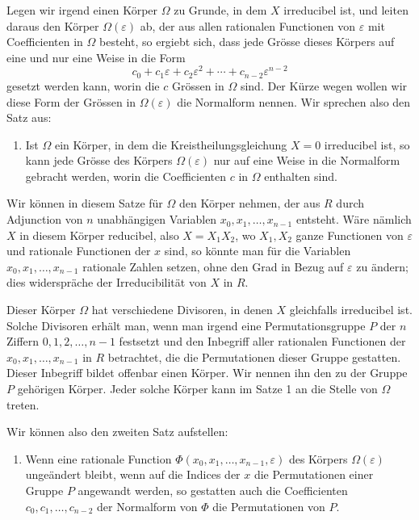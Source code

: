 \documentclass[11pt]{article}
\begin{document}
Legen wir irgend einen K\"orper $\Omega$ zu Grunde, in dem $X$ irreducibel ist, und leiten daraus den K\"orper $\Omega(\varepsilon)$ ab, der aus allen rationalen Functionen von $\varepsilon$ mit Coefficienten in $\Omega$ besteht, so ergiebt sich, dass jede Gr\"osse dieses K\"orpers auf eine und nur eine Weise in die Form
\begin{equation}\tag{3}
  c_0+c_1\varepsilon+c_2\varepsilon^2+\cdots+c_{n-2}\varepsilon^{n-2}
\end{equation}
gesetzt werden kann, worin die $c$ Gr\"ossen in $\Omega$ sind. Der K\"urze wegen wollen wir diese Form der Gr\"ossen in $\Omega(\varepsilon)$ die Normalform nennen. Wir sprechen also den Satz aus:

\begin{enumerate}[label=\arabic*.]
\item Ist $\Omega$ ein K\"orper, in dem die Kreistheilungsgleichung $X=0$ irreducibel ist, so kann jede Gr\"osse des K\"orpers $\Omega(\varepsilon)$ nur auf eine Weise in die Normalform gebracht werden, worin die Coefficienten $c$ in $\Omega$ enthalten sind.
\end{enumerate}

Wir k\"onnen in diesem Satze f\"ur $\Omega$ den K\"orper nehmen, der aus $R$ durch Adjunction von $n$ unabh\"angigen Variablen $x_0,x_1,\ldots,x_{n-1}$ entsteht. W\"are n\"amlich $X$ in diesem K\"orper reducibel, also $X=X_1X_2$, wo $X_1,X_2$ ganze Functionen von $\varepsilon$ und rationale Functionen der $x$ sind, so k\"onnte man f\"ur die Variablen $x_0,x_1,\ldots,x_{n-1}$ rationale Zahlen setzen, ohne den Grad in Bezug auf $\varepsilon$ zu \"andern; dies widerspr\"ache der Irreducibilit\"at von $X$ in $R$.

Dieser K\"orper $\Omega$ hat verschiedene Divisoren, in denen $X$ gleichfalls irreducibel ist. Solche Divisoren erh\"alt man, wenn man irgend eine Permutationsgruppe $P$ der $n$ Ziffern $0,1,2,\ldots,n-1$ festsetzt und den Inbegriff aller rationalen Functionen der $x_0,x_1,\ldots,x_{n-1}$ in $R$ betrachtet, die die Permutationen dieser Gruppe gestatten. Dieser Inbegriff bildet offenbar einen K\"orper. Wir nennen ihn den zu der Gruppe $P$ geh\"origen K\"orper. Jeder solche K\"orper kann im Satze 1 an die Stelle von $\Omega$ treten.

Wir k\"onnen also den zweiten Satz aufstellen:

\begin{enumerate}[resume,label=\arabic*.]
\item Wenn eine rationale Function $\Phi(x_0,x_1,\ldots,x_{n-1},\varepsilon)$ des K\"orpers $\Omega(\varepsilon)$ unge\"andert bleibt, wenn auf die Indices der $x$ die Permutationen einer Gruppe $P$ angewandt werden, so gestatten auch die Coefficienten $c_0,c_1,\ldots,c_{n-2}$ der Normalform von $\Phi$ die Permutationen von $P$.
\end{enumerate}
\end{document}

